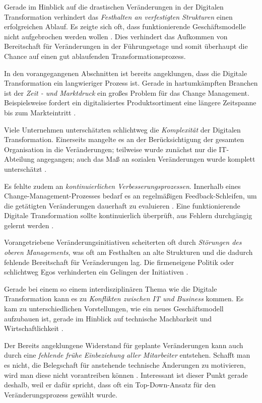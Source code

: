 Gerade im Hinblick auf die drastischen Veränderungen in der Digitalen Transformation verhindert das \textit{Festhalten an verfestigten Strukturen} einen erfolgreichen Ablauf. Es zeigte sich oft, dass funktionierende Geschäftsmodelle nicht aufgebrochen werden wollen \cite[S. 194]{gassmann_digitale_2016}. Dies verhindert das Aufkommen von Bereitschaft für Veränderungen in der Führungsetage und somit überhaupt die Chance auf einen gut ablaufenden Transformationsprozess.

In den vorangegangenen Abschnitten ist bereits angeklungen, dass die Digitale Transformation ein langwieriger Prozess ist. Gerade in hartumkämpften Branchen ist der \textit{Zeit - und Marktdruck} ein großes Problem für das Change Management. Beispielsweise fordert ein digitalisiertes Produktsortiment eine längere Zeitspanne bis zum Markteintritt \cite[S. 183]{urbach_digitalization_2018}.

Viele Unternehmen unterschätzten schlichtweg die \textit{Komplexität} der Digitalen Transformation. Einerseits mangelte  es an der Berücksichtigung der gesamten Organisation in die Veränderungen; teilweise wurde zunächst nur die IT-Abteilung angegangen; auch das Maß an sozialen Veränderungen wurde komplett unterschätzt \cite[S. 4]{hoberg_skills_2017}.

Es fehlte zudem an \textit{kontinuierlichen Verbesserungsprozessen}. Innerhalb eines Change-Management-Prozesses bedarf es an regelmäßigen Feedback-Schleifen, um die getätigten Veränderungen dauerhaft zu evaluieren \cite[S. 13]{kaune_change_2016}. Eine funktionierende Digitale Transformation sollte kontinuierlich überprüft, aus Fehlern durchgängig gelernt werden \cite[S. 15]{chanias_digital_2018}.

Vorangetriebene Veränderungsinitiativen scheiterten oft durch \textit{Störungen des oberen Managements}, was oft am Festhalten an alte Strukturen und die dadurch fehlende Bereitschaft für Veränderungen lag. Die firmeneigene Politik oder schlichtweg Egos verhinderten ein Gelingen der Initiativen \cite[S. 4]{solis_2017_2017}.

Gerade bei einem so einem interdisziplinären Thema wie die Digitale Transformation kann es zu \textit{Konflikten zwischen IT und Business} kommen. Es kam zu unterschiedlichen Vorstellungen, wie ein neues Geschäftsmodell aufzubauen ist, gerade im Hinblick auf technische Machbarkeit und Wirtschaftlichkeit \cite[S. 117]{oswald_digitale_2018}.

Der Bereits angeklungene Widerstand für geplante Veränderungen kann auch durch eine \textit{fehlende frühe Einbeziehung aller Mitarbeiter} entstehen. Schafft man es nicht, die Belegschaft  für anstehende technische Änderungen zu motivieren, wird man diese nicht vorantreiben können \cite[S. 40]{kawohl_digitale_2016}. Interessant ist dieser Punkt gerade deshalb, weil er dafür spricht, dass oft ein Top-Down-Ansatz für den Veränderungsprozess gewählt wurde.

